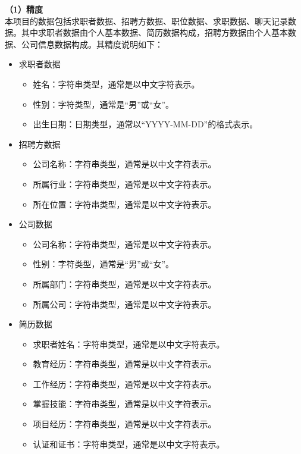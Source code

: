 \documentclass[UTF8,a4paper,10pt]{ctexart}
\begin{document}
\textbf{（1）精度}\\
本项目的数据包括求职者数据、招聘方数据、职位数据、求职数据、聊天记录数据。其中求职者数据由个人基本数据、简历数据构成，招聘方数据由个人基本数据、公司信息数据构成。其精度说明如下：

\begin{itemize}
    \item 求职者数据
        \begin{itemize}
            \item 姓名：字符串类型，通常是以中文字符表示。
            \item 性别：字符类型，通常是“男”或“女”。
            \item 出生日期：日期类型，通常以“YYYY-MM-DD”的格式表示。
        \end{itemize}
    \item 招聘方数据
        \begin{itemize}
                \item 公司名称：字符串类型，通常是以中文字符表示。
                \item 所属行业：字符串类型，通常是以中文字符表示。
                \item 所在位置：字符串类型，通常是以中文字符表示。
        \end{itemize}
    \item 公司数据
        \begin{itemize}
                \item 公司名称：字符串类型，通常是以中文字符表示。
                \item 性别：字符类型，通常是“男”或“女”。
                \item 所属部门：字符串类型，通常是以中文字符表示。
                \item 所属公司：字符串类型，通常是以中文字符表示。
        \end{itemize}
    \item 简历数据
        \begin{itemize}
                \item 求职者姓名：字符串类型，通常是以中文字符表示。
                \item 教育经历：字符串类型，通常是以中文字符表示。
                \item 工作经历：字符串类型，通常是以中文字符表示。
                \item 掌握技能：字符串类型，通常是以中文字符表示。
                \item 项目经历：字符串类型，通常是以中文字符表示。
                \item 认证和证书：字符串类型，通常是以中文字符表示。

\end{itemize}
\end{itemize}
\end{document}
